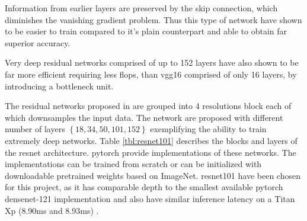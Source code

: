 Information from earlier layers are preserved by the skip connection, which diminishes the vanishing gradient problem. Thus this type of network have shown to be easier to train compared to it’s plain counterpart and able to obtain far superior accuracy.  

Very deep residual networks comprised of up to 152 layers have also shown to be far more efficient requiring less \gls{flop}s, than \gls{vgg}16 comprised of only 16 layers, by introducing a bottleneck unit.

The residual networks proposed in \cite{he_deep_2015} are grouped into 4 resolutions block each of which downsamples the input data. The network are proposed with different number of layers $ \left\{18, 34, 50, 101, 152\right\} $ exemplifying the ability to train extremely deep networks. Table \ref{tbl:resnet101} describes the blocks and layers of the \gls{resnet} architecture. \gls{pytorch} provide implementations of these networks. The implementations can be trained from scratch or can be initialized with downloadable pretrained weights based on ImageNet. \gls{resnet}101 have been chosen for this project, as it has comparable depth to the smallest available \gls{pytorch} \gls{densenet}-121 implementation and also have similar inference latency on a Titan Xp (8.90ms and 8.93ms) \cite{bianco_benchmark_2018}.

